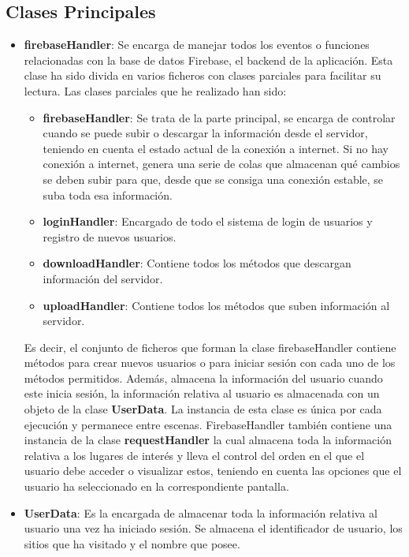\subsection{Clases Principales}
\begin{itemize}
\item \textbf{firebaseHandler}: Se encarga de manejar todos los eventos o funciones relacionadas con la base de datos Firebase, el backend de la aplicación. Esta clase ha sido divida en varios ficheros con clases parciales para facilitar su lectura.
Las clases parciales que he realizado han sido:
\begin{itemize}
    \item \textbf{firebaseHandler}: Se trata de la parte principal, se encarga de controlar cuando se puede subir o descargar la información desde el servidor, teniendo en cuenta el estado actual de la conexión a internet. Si no hay conexión a internet, genera una serie de colas que almacenan qué cambios se deben subir para que, desde que se consiga una conexión estable, se suba toda esa información.
    
    \item \textbf{loginHandler}: Encargado de todo el sistema de login de usuarios y registro de nuevos usuarios.
    
    \item \textbf{downloadHandler}: Contiene todos los métodos que descargan información del servidor.
    
    \item \textbf{uploadHandler}: Contiene todos los métodos que suben información al servidor.
    
\end{itemize}

Es decir, el conjunto de ficheros que forman la clase firebaseHandler contiene métodos para crear nuevos usuarios o para iniciar sesión con cada uno de los métodos permitidos. Además, almacena la información del usuario cuando este inicia sesión, la información relativa al usuario es almacenada con un objeto de la clase \textbf{UserData}. La instancia de esta clase es única por cada ejecución y permanece entre escenas. FirebaseHandler también contiene una instancia de la clase \textbf{requestHandler} la cual almacena toda la información relativa a los lugares de interés y lleva el control del orden en el que el usuario debe acceder o visualizar estos, teniendo en cuenta las opciones que el usuario ha seleccionado en la correspondiente pantalla.

\item \textbf{UserData}: Es la encargada de almacenar toda la información relativa al usuario una vez ha iniciado sesión. Se almacena el identificador de usuario, los sitios que ha visitado y el nombre que posee.


\end{itemize}

